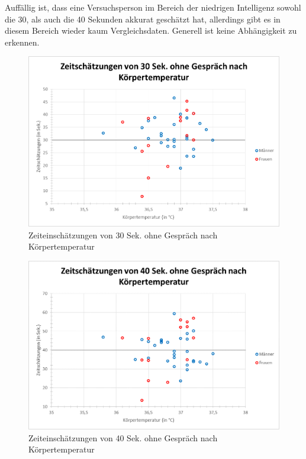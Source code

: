 \documentclass{Paper}
\begin{document}
Auffällig ist, dass eine Versuchsperson im Bereich der niedrigen Intelligenz sowohl die 30, als auch die 40 Sekunden akkurat geschätzt hat, allerdings gibt es in diesem Bereich wieder kaum Vergleichsdaten. Generell ist keine Abhängigkeit zu erkennen.






\begin{figure}[H]
	\centering
	\includegraphics[scale=0.7]{../Diagramme/scatterPost/30ohne_koerpertemperatur.png}
	\caption{Zeiteinschätzungen von 30 Sek. ohne Gespräch nach Körpertemperatur}
	\label{img:posttemp30ohne}
\end{figure}
\begin{figure}[H]
	\centering
	\includegraphics[scale=0.7]{../Diagramme/scatterPost/40ohne_koerpertemperatur.png}
	\caption{Zeiteinschätzungen von 40 Sek. ohne Gespräch nach Körpertemperatur}
	\label{img:posttemp40ohne}
\end{figure}
\end{document}
